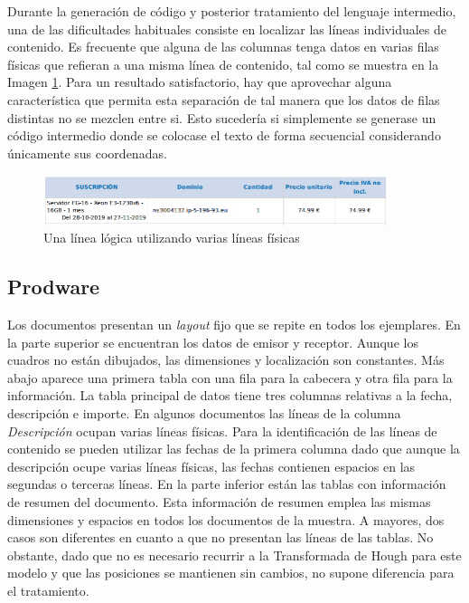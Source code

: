 Durante la generación de código y posterior tratamiento del lenguaje intermedio, una de las dificultades habituales consiste en localizar las líneas individuales de contenido. Es frecuente que alguna de las columnas tenga datos en varias filas físicas que refieran a una misma línea de contenido, tal como se muestra en la Imagen \ref{fig:una-linea-lógica-varias-fisicas}. Para un resultado satisfactorio, hay que aprovechar alguna característica que permita esta separación de tal manera que los datos de filas distintas no se mezclen entre si. Esto sucedería si simplemente se generase un código intermedio donde se colocase el texto de forma secuencial considerando únicamente sus coordenadas.

\begin{figure}[hp!]
    \centering
    \includegraphics[width=0.9\textwidth]{imaxes/g-analisis/varias-lineas-en-una.png}
    \caption{Una línea lógica utilizando varias líneas físicas}
    \label{fig:una-linea-lógica-varias-fisicas}
\end{figure}

\subsection{Prodware}

Los documentos presentan un \emph{layout} fijo que se repite en todos los ejemplares. En la parte superior se encuentran los datos de emisor y receptor. Aunque los cuadros no están dibujados, las dimensiones y localización son constantes. Más abajo aparece una primera tabla con una fila para la cabecera y otra fila para la información. La tabla principal de datos tiene tres columnas relativas a la fecha, descripción e importe. En algunos documentos las líneas de la columna \emph{Descripción} ocupan varias líneas físicas. Para la identificación de las líneas de contenido se pueden utilizar las fechas de la primera columna dado que aunque la descripción ocupe varias líneas físicas, las fechas contienen espacios en las segundas o terceras líneas. En la parte inferior están las tablas con información de resumen del documento. Esta información de resumen emplea las mismas dimensiones y espacios en todos los documentos de la muestra. A mayores, dos casos son diferentes en cuanto a que no presentan las líneas de las tablas. No obstante, dado que no es necesario recurrir a la Transformada de Hough para este modelo y que las posiciones se mantienen sin cambios, no supone diferencia para el tratamiento.
 
